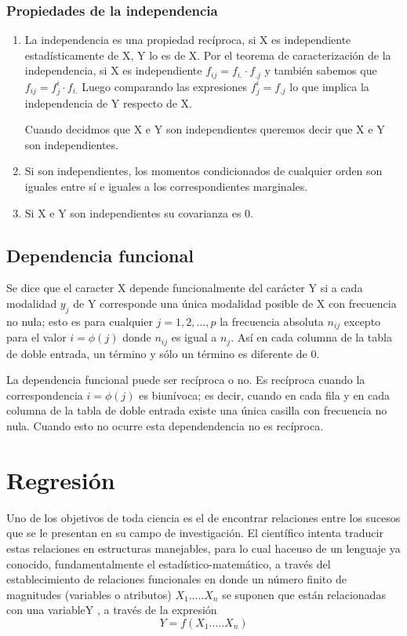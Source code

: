 \documentclass{article}
\begin{document}
 
 \subsubsection{Propiedades de la independencia}
 
 \begin{enumerate}
  \item La independencia es una propiedad recíproca, si X es independiente estadísticamente de X, Y lo es de X. Por el teorema de caracterización de la independencia, si X es independiente $ f_{ij} = f_{i.} \cdot f_{.j} $ y también sabemos que $f_{ij} = f_j^i \cdot f_{i.}$ Luego comparando las expresiones  $f_j^i = f_{.j} $ lo que implica la independencia de Y respecto de X.
 
 Cuando decidmos que X e Y son independientes queremos decir que X e Y son independientes.
 
 \item Si son independientes, los momentos condicionados de cualquier orden son iguales entre sí e iguales a los correspondientes marginales.
 \item Si X e Y son independientes su covarianza es 0.
 
 \end{enumerate}
 
\subsection{Dependencia funcional}
	Se dice que el caracter X depende funcionalmente del carácter Y si a cada modalidad $y_j$ de Y corresponde una única modalidad posible de X con frecuencia no nula; esto es para cualquier $j = 1,2, \dots, p$ la frecuencia absoluta $n_{ij}$ excepto para el valor $i = \phi (j)$ donde $n_{ij} $ es igual a $n_j$. Así en cada columna de la tabla de doble entrada, un término y sólo un término es diferente de 0.
	
	La dependencia funcional puede ser recíproca o no. Es recíproca cuando la correspondencia $i = \phi (j)$ es biunívoca; es decir, cuando en cada fila y en cada columna de la tabla de doble entrada existe una única casilla con frecuencia no nula. Cuando esto no ocurre esta dependendencia no es recíproca.
	
\section{Regresión}
	Uno de los objetivos de toda ciencia es el de encontrar relaciones entre los sucesos que se le presentan en su campo de investigación. El científico intenta traducir estas relaciones en estructuras manejables, para lo cual haceuso de un lenguaje ya conocido, fundamentalmente el estadístico-matemático, a través del establecimiento de relaciones funcionales en donde un número finito de magnitudes (variables o atributos) $X_1 ..... X_n$ se suponen que están relacionadas con una variableY , a través de la expresión $$ Y = f (X_1 ..... X_n)$$
	
\end{document}
